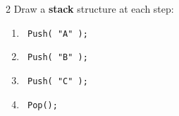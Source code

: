 \documentclass[a4paper,12pt,oneside]{book}
\newcounter{question}
\begin{document}
        \begin{question}{\thequestion}{2}
            Draw a \textbf{stack} structure at each step:

            \begin{enumerate}
                \item   \begin{verbatim} Push( "A" ); \end{verbatim}
                
                \item   \begin{verbatim} Push( "B" ); \end{verbatim}
                
                \item   \begin{verbatim} Push( "C" ); \end{verbatim}

                \item   \begin{verbatim} Pop(); \end{verbatim}
                

\end{enumerate}
\end{question}
\end{document}
